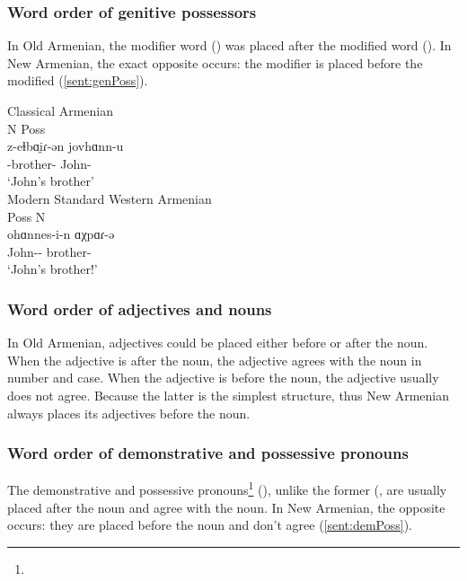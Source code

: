 \subsubsection{Word order of genitive possessors}

In Old Armenian, the modifier word () was placed after the modified word (). In New Armenian, the exact opposite occurs: the modifier is placed before the modified (\ref{sent:genPoss}). 

\begin{exe}
	
	\ex \label{sent:genPoss}   \begin{xlist}
		\ex Classical Armenian \\ \glll N Poss \\
		z-eɫbɑi̯ɾ-ən jovhɑnn-u \\
		{\acc}-brother-{\dist} John-{\gen} \\
		\trans `John's brother'\\
		\ex Modern Standard Western Armenian \\ \glll Poss N \\
		ohɑnnes-i-n ɑχpɑɾ-ə \\ 
		John-{\gen}-{} brother-{} \\
		\trans `John's brother!'\\
	\end{xlist}
\end{exe}

\subsubsection{Word order of adjectives and nouns}

In Old Armenian, adjectives could be placed either before or after the noun. When the adjective is after the noun, the adjective agrees with the noun in number and case. When the adjective is before the noun, the adjective usually does not agree. Because the latter is the simplest structure, thus New Armenian always places its adjectives before the noun. 

\subsubsection{Word order of demonstrative and possessive pronouns}

The demonstrative and possessive pronouns\footnote{} (), unlike the former (, are usually placed after the noun and agree with the noun. In New Armenian, the opposite occurs: they are placed before the noun and don't agree (\ref{sent:demPoss}). 


